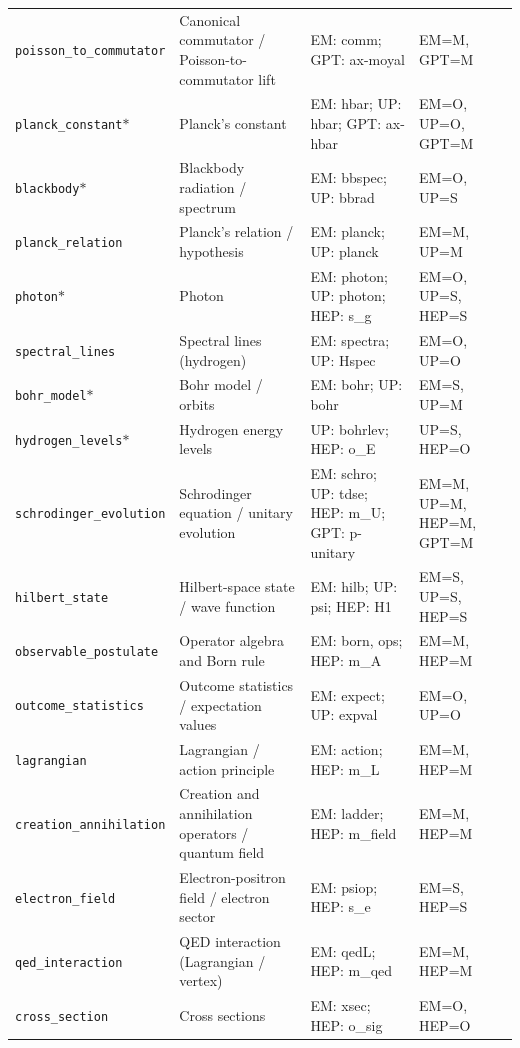 \begin{longtable}{@{}p{3.1cm}p{3.6cm}p{5.0cm}p{2.9cm}@{}}
\texttt{poisson\_\allowbreak{{}}to\_\allowbreak{{}}commutator} & Canonical commutator / Poisson-to-commutator lift & EM: comm; GPT: ax-moyal & EM=M, GPT=M \\
\texttt{planck\_\allowbreak{{}}constant}$\ast$ & Planck's constant & EM: hbar; UP: hbar; GPT: ax-hbar & EM=O, UP=O, GPT=M \\
\texttt{blackbody}$\ast$ & Blackbody radiation / spectrum & EM: bbspec; UP: bbrad & EM=O, UP=S \\
\texttt{planck\_\allowbreak{{}}relation} & Planck's relation / hypothesis & EM: planck; UP: planck & EM=M, UP=M \\
\texttt{photon}$\ast$ & Photon & EM: photon; UP: photon; HEP: s\_g & EM=O, UP=S, HEP=S \\
\texttt{spectral\_\allowbreak{{}}lines} & Spectral lines (hydrogen) & EM: spectra; UP: Hspec & EM=O, UP=O \\
\texttt{bohr\_\allowbreak{{}}model}$\ast$ & Bohr model / orbits & EM: bohr; UP: bohr & EM=S, UP=M \\
\texttt{hydrogen\_\allowbreak{{}}levels}$\ast$ & Hydrogen energy levels & UP: bohrlev; HEP: o\_E & UP=S, HEP=O \\
\texttt{schrodinger\_\allowbreak{{}}evolution} & Schrodinger equation / unitary evolution & EM: schro; UP: tdse; HEP: m\_U; GPT: p-unitary & EM=M, UP=M, HEP=M, GPT=M \\
\texttt{hilbert\_\allowbreak{{}}state} & Hilbert-space state / wave function & EM: hilb; UP: psi; HEP: H1 & EM=S, UP=S, HEP=S \\
\texttt{observable\_\allowbreak{{}}postulate} & Operator algebra and Born rule & EM: born, ops; HEP: m\_A & EM=M, HEP=M \\
\texttt{outcome\_\allowbreak{{}}statistics} & Outcome statistics / expectation values & EM: expect; UP: expval & EM=O, UP=O \\
\texttt{lagrangian} & Lagrangian / action principle & EM: action; HEP: m\_L & EM=M, HEP=M \\
\texttt{creation\_\allowbreak{{}}annihilation} & Creation and annihilation operators / quantum field & EM: ladder; HEP: m\_field & EM=M, HEP=M \\
\texttt{electron\_\allowbreak{{}}field} & Electron-positron field / electron sector & EM: psiop; HEP: s\_e & EM=S, HEP=S \\
\texttt{qed\_\allowbreak{{}}interaction} & QED interaction (Lagrangian / vertex) & EM: qedL; HEP: m\_qed & EM=M, HEP=M \\
\texttt{cross\_\allowbreak{{}}section} & Cross sections & EM: xsec; HEP: o\_sig & EM=O, HEP=O \\

\end{longtable}
